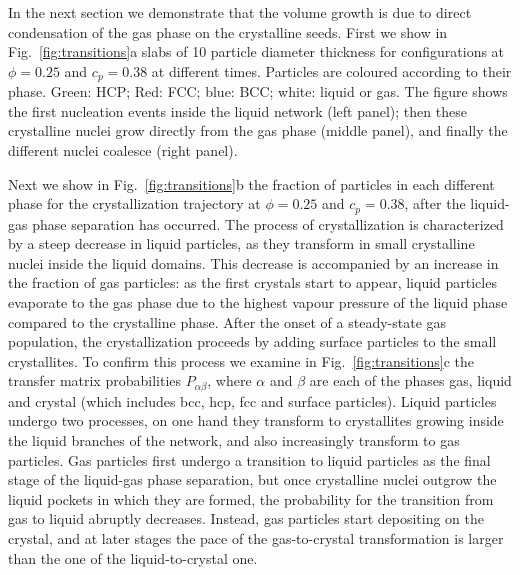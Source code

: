 \documentclass[twocolumn,showpacs,amsmath,amssymb,pre,superscriptaddress]{revtex4}
\begin{document}
In the next section we demonstrate that the volume growth is due to direct condensation of the gas phase on the crystalline seeds.
First we show in Fig.~\ref{fig:transitions}a slabs of 10 particle diameter thickness for configurations at $\phi=0.25$ and $c_p=0.38$ at different times.
Particles are coloured according to their phase. Green: HCP; Red: FCC; blue: BCC; white: liquid or gas. The figure shows the first nucleation
events inside the liquid network (left panel); then these crystalline nuclei grow directly from the gas phase (middle panel), and finally
the different nuclei coalesce (right panel). 

Next we show in Fig.~\ref{fig:transitions}b the fraction of particles in each different phase for the crystallization trajectory at
$\phi=0.25$ and $c_p=0.38$, after the liquid-gas phase separation has occurred. The process of crystallization is characterized
by a steep decrease in liquid particles, as they transform in small crystalline nuclei inside the liquid domains. This decrease
is accompanied by an increase in the fraction of gas particles: as the first crystals start to appear, liquid particles evaporate
to the gas phase due to the highest vapour pressure of the liquid phase compared to the crystalline phase. After the onset
of a steady-state gas population, the crystallization proceeds by adding surface particles to the small crystallites. To confirm this process we
examine in Fig.~\ref{fig:transitions}c the transfer matrix probabilities $P_{\alpha\beta}$, where $\alpha$ and $\beta$ are each of the
phases gas, liquid and crystal (which includes bcc, hcp, fcc and surface particles). Liquid particles undergo two processes, on one
hand they transform to crystallites growing inside the liquid branches of the network, and also increasingly transform to gas particles.
Gas particles first undergo a transition to liquid particles as the final stage of the liquid-gas phase separation, but once
crystalline nuclei outgrow the liquid pockets in which they are formed, the probability for the transition from gas to liquid
abruptly decreases. Instead, gas particles start depositing on the crystal, and at later stages the pace of the gas-to-crystal transformation
is larger than the one of the liquid-to-crystal one.
\end{document}
